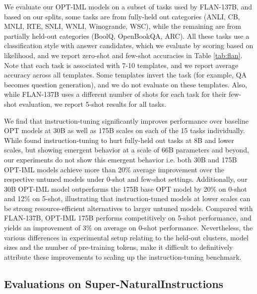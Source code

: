 We evaluate our OPT-IML models on a subset of tasks used by FLAN-137B, and based on our splits, some tasks are from fully-held out categories (ANLI, CB, MNLI, RTE, SNLI, WNLI, Winogrande, WSC), while the remaining are from partially held-out categories (BoolQ, OpenBookQA, ARC). All these tasks use a classification style with answer candidates, which we evaluate by scoring based on likelihood, and we report zero-shot and few-shot accuracies in Table \ref{tab:flan}. Note that each task is associated with 7-10 templates, and we report average accuracy across all templates. Some templates invert the task (for example, QA becomes question generation), and we do not evaluate on these templates. Also, while FLAN-137B uses a different number of shots for each task for their few-shot evaluation, we report 5-shot results for all tasks. 

We find that instruction-tuning significantly improves performance over baseline OPT models at 30B as well as 175B scales on each of the 15 tasks individually. While \cite{wei2021flan} found instruction-tuning to hurt fully-held out tasks at 8B and lower scales, but showing emergent behavior at a scale of 66B parameters and beyond, our experiments do not show this emergent behavior i.e. both 30B and 175B OPT-IML models achieve more than 20\% average improvement over the respective untuned models under 0-shot and few-shot settings. Additionally, our 30B OPT-IML model outperforms the 175B base OPT model by 20\% on 0-shot and 12\% on 5-shot, illustrating that instruction-tuned models at lower scales can be strong resource-efficient alternatives to larger untuned models. Compared with FLAN-137B, OPT-IML 175B performs competitively on 5-shot performance, and yields an improvement of 3\% on average on 0-shot performance. Nevertheless, the various differences in experimental setup relating to the held-out clusters, model sizes and the number of pre-training tokens, make it difficult to definitively attribute these improvements to scaling up the instruction-tuning benchmark.

\subsection{Evaluations on Super-NaturalInstructions}

